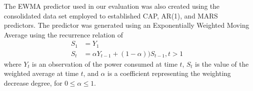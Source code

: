\documentclass[prodmode,acmtaco,pdftex]{acmsmall}
\begin{document}
The EWMA predictor used in our evaluation was also created using the
consolidated data set employed to established CAP, AR(1), and MARS
predictors.  The predictor was generated using an Exponentially Weighted
Moving Average using the recurrence relation of
\begin{align}
  \label{eq:1}
  S_{1}&=Y_{1}\nonumber\\
  S_{t}&=\alpha Y_{t-1}+(1-\alpha))S_{t-1}, t>1\nonumber
\end{align}
where $Y_{t}$ is an observation of the power consumed at time $t$,
$S_{t}$ is the value of the weighted average at time $t$, and $\alpha$
is a coefficient representing the weighting decrease degree, for
$0\leq \alpha \leq1$.

\label{sec:references}



\end{document}
